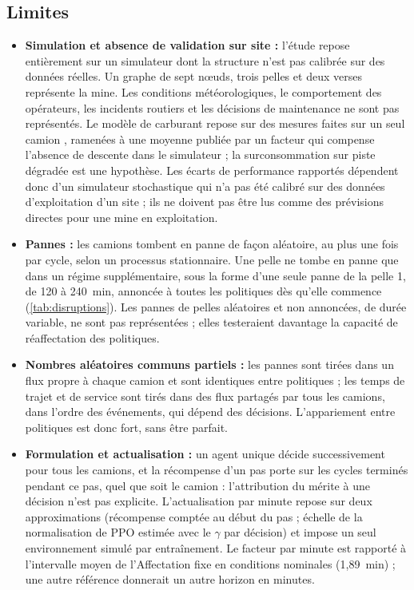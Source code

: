 \documentclass[11pt,a4paper]{article}
\newif\ifrevmarks
\newcommand{\revtag}[1]{\ifrevmarks\textsuperscript{\textcolor{red!70!black}{\scriptsize[#1]}}\fi}
\newenvironment{revbloc}[1]{\par\ifrevmarks\color{revcolor}\noindent\revtag{#1}\ \fi}{\par}
\newif\ifcorrmarks
\newcommand{\corr}[1]{\ifcorrmarks\textcolor{corrcolor}{#1}\else#1\fi}
\begin{document}
\subsection{Limites}
\label{sec:limitations}

\begin{revbloc}{M7, M8, M9, M11, M12, M25, N1--N5, v3, T31}
\begin{itemize}
  \item \textbf{Simulation et absence de validation sur site :} l'étude repose entièrement sur un simulateur dont la structure n'est pas calibrée sur des données réelles. Un graphe de sept nœuds, trois pelles et deux verses représente la mine. Les conditions météorologiques, le comportement des opérateurs, les incidents routiers et les décisions de maintenance ne sont pas représentés. Le modèle de carburant repose sur des mesures faites sur un seul camion \cite{Kubler2015}, ramenées à une moyenne publiée par un facteur qui compense l'absence de descente dans le simulateur ; la surconsommation sur piste dégradée est une hypothèse. \corr{Les écarts de performance rapportés dépendent donc d'un simulateur stochastique qui n'a pas été calibré sur des données d'exploitation d'un site ; ils ne doivent pas être lus comme des prévisions directes pour une mine en exploitation.}
  \item \textbf{Pannes :} \corr{les camions tombent en panne de façon aléatoire}, au plus une fois par cycle, selon un processus stationnaire. \corr{Une pelle ne tombe en panne que dans un régime supplémentaire, sous la forme d'une seule panne de la pelle 1, de 120 à 240~min, annoncée à toutes les politiques dès qu'elle commence (\cref{tab:disruptions}). Les pannes de pelles aléatoires et non annoncées, de durée variable, ne sont pas représentées ; elles testeraient davantage la capacité de réaffectation des politiques.}
  \item \textbf{Nombres aléatoires communs partiels :} les pannes sont tirées dans un flux propre à chaque camion et sont identiques entre politiques ; les temps de trajet et de service sont tirés dans des flux partagés par tous les camions, dans l'ordre des événements, qui dépend des décisions. L'appariement entre politiques est donc fort, sans être parfait.
  \item \textbf{Formulation et actualisation :} un agent unique décide successivement pour tous les camions, et la récompense d'un pas porte sur les cycles terminés pendant ce pas, quel que soit le camion : l'attribution du mérite à une décision n'est pas explicite. L'actualisation par minute repose sur deux approximations (récompense comptée au début du pas ; échelle de la normalisation de PPO estimée avec le $\gamma$ par décision) et impose un seul environnement simulé par entraînement. Le facteur par minute est rapporté à l'intervalle moyen de l'Affectation fixe en conditions nominales (1,89~min) ; une autre référence donnerait un autre horizon en minutes.

\end{itemize}
\end{revbloc}
\end{document}
